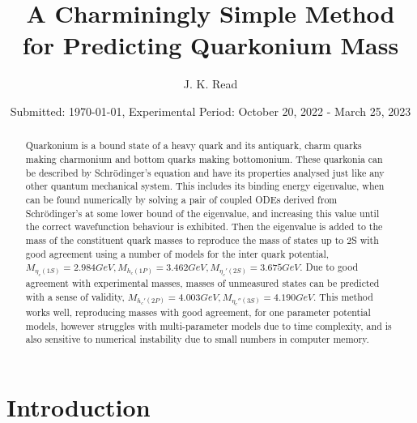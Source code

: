 \documentclass[10pt,twocolumn]{revtex4}    %
\begin{document}
\title{A Charminingly Simple Method for Predicting Quarkonium Mass} 
\date{Submitted: \today{}, Experimental Period: October 20, 2022 - March 25, 2023}
\author{J. K. Read}


\begin{abstract}              
 
Quarkonium is a bound state of a heavy quark and its antiquark, charm quarks making charmonium and bottom quarks making bottomonium. These quarkonia can be described by Schr\"odinger's equation and have its properties analysed just like any other quantum mechanical system. This includes its binding energy eigenvalue, when can be found numerically by solving a pair of coupled ODEs derived from Schr\"odinger's at some lower bound of the eigenvalue, and increasing this value until the correct wavefunction behaviour is exhibited. Then the eigenvalue is added to the mass of the constituent quark masses to reproduce the mass of states up to 2S with good agreement using a number of models for the inter quark potential, $M_{\eta_c(1S)} = 2.984GeV, M_{h_c(1P)} = 3.462GeV, M_{\eta_c'(2S)} = 3.675GeV$. Due to good agreement with experimental masses, masses of unmeasured states can be predicted with a sense of validity, $M_{h_c'(2P)} = 4.003GeV, M_{\eta_c''(3S)} = 4.190GeV$. This method works well, reproducing masses with good agreement, for one parameter potential models, however struggles with multi-parameter models due to time complexity, and is also sensitive to numerical instability due to small numbers in computer memory. 

\end{abstract}

\maketitle

\thispagestyle{plain} %

\section{Introduction} \label{sec:Introduction}
\end{document}
